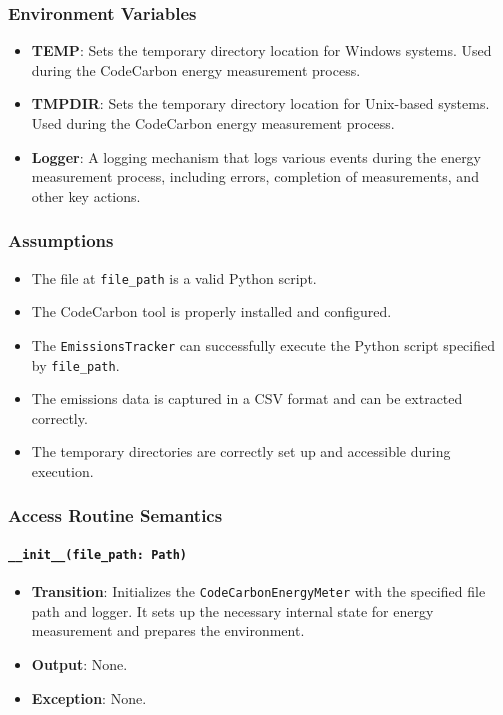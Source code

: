 \documentclass[12pt, titlepage]{article}
\begin{document}
\subsubsection{Environment Variables}

\begin{itemize}
  \item \textbf{TEMP}: Sets the temporary directory location for Windows systems. Used during the CodeCarbon energy measurement process.
  \item \textbf{TMPDIR}: Sets the temporary directory location for Unix-based systems. Used during the CodeCarbon energy measurement process.
  \item \textbf{Logger}: A logging mechanism that logs various events during the energy measurement process, including errors, completion of measurements, and other key actions.
\end{itemize}

\subsubsection{Assumptions}

\begin{itemize}
  \item The file at \texttt{file\_path} is a valid Python script.
  \item The CodeCarbon tool is properly installed and configured.
  \item The \texttt{EmissionsTracker} can successfully execute the Python script specified by \texttt{file\_path}.
  \item The emissions data is captured in a CSV format and can be extracted correctly.
  \item The temporary directories are correctly set up and accessible during execution.
\end{itemize}

\subsubsection{Access Routine Semantics}
\paragraph{\texttt{\_\_init\_\_(file\_path: Path)}}
\begin{itemize}
  \item \textbf{Transition}: Initializes the \texttt{CodeCarbonEnergyMeter} with the specified file path and logger. It sets up the necessary internal state for energy measurement and prepares the environment.
  \item \textbf{Output}: None.
  \item \textbf{Exception}: None.
\end{itemize}
\end{document}
